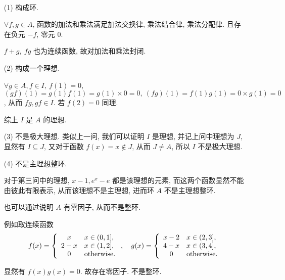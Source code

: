 \begin{solution}\
	\begin{itemize}
		\item[(1)] 构成环.

		$\forall f,g\in A$, 函数的加法和乘法满足加法交换律, 乘法结合律, 乘法分配律.
		且存在负元 $-f$, 零元 $0$.

		$f+g,\ fg$ 也为连续函数, 故对加法和乘法封闭.

		\item[(2)] 构成一个理想.

		$\forall g\in A,f\in I,\ f(1)=0$, $(gf)(1)=g(1)f(1)=g(1)\times 0=0,\ (fg)(1)=f(1)g(1)=0\times g(1)=0$, 从而 $fg,gf\in I$. 若 $f(2)=0$ 同理.

		综上 $I$ 是 $A$ 的理想.

		\item[(3)] 不是极大理想. 类似上一问, 我们可以证明 $I$ 是理想, 并记上问中理想为 $J$, 显然有 $I\subseteq J$, 又对于函数 $f(x)=x\notin J$, 从而 $J\neq A$, 所以 $I$ 不是极大理想.

		\item[(4)] 不是主理想整环.

		对于第三问中的理想, $x-1,e^x-e$ 都是该理想的元素, 而这两个函数显然不能由彼此有限表示, 从而该理想不是主理想, 进而环 $A$ 不是主理想整环.

		也可以通过说明 $A$ 有零因子, 从而不是整环.

		例如取连续函数
		$$f(x)=\left\{\begin{array}{cl}
			x & x\in (0,1], \\
			2-x & x\in (1,2], \\
			0 & \text {otherwise}.
		\end{array}\right.,\quad g(x)=\left\{
			\begin{array}{cl}
				x-2 & x\in (2,3], \\
				4-x & x\in (3,4], \\
				0 & \text {otherwise}.
			\end{array}
		\right.$$

		显然有 $f(x)g(x)=0$. 故存在零因子. 不是整环.
	\end{itemize}
\end{solution}

\problem[题目 3]

